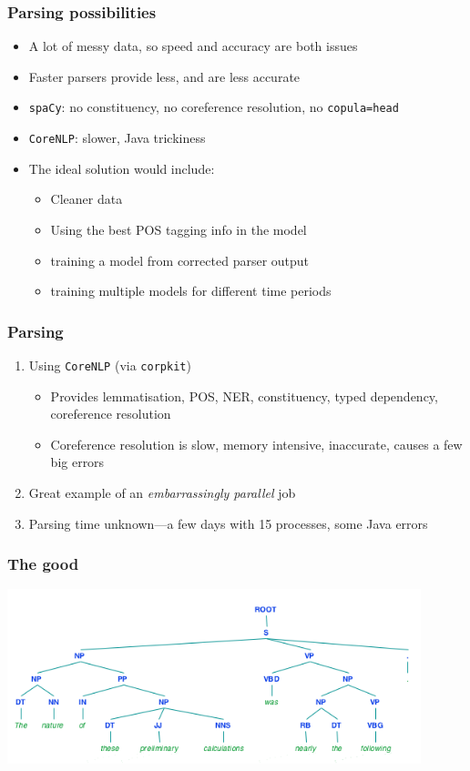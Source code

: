\documentclass{beamer}       %
\begin{document}
\begin{frame}
\frametitle{Parsing possibilities}
\begin{itemize}
    \item A lot of messy data, so speed and accuracy are both issues
    \item Faster parsers provide less, and are less accurate
    \item \texttt{spaCy}: no constituency, no coreference resolution, no \texttt{copula=head}
    \item \texttt{CoreNLP}: slower, Java trickiness
    \item The ideal solution would include:
    \begin{itemize}
        \item Cleaner data 
        \item Using the best POS tagging info in the model
        \item training a model from corrected parser output
        \item training multiple models for different time periods
    \end{itemize}
\end{itemize}

\end{frame}

\begin{frame}
\frametitle{Parsing}
\begin{enumerate}
    \item Using \texttt{CoreNLP} (via \texttt{corpkit})
    \begin{itemize}
        \item Provides lemmatisation, POS, NER, constituency, typed dependency, coreference resolution
        \item Coreference resolution is slow, memory intensive, inaccurate, causes a few big errors
    \end{itemize}
    \item Great example of an \emph{embarrassingly parallel} job
    \item Parsing time unknown---a few days with 15 processes, some Java errors
\end{enumerate}
\end{frame}


\begin{frame}
    \frametitle{The good}
    \centering
    \includegraphics[width=0.90\textwidth]{../images/good}
\end{frame}
\end{document}
